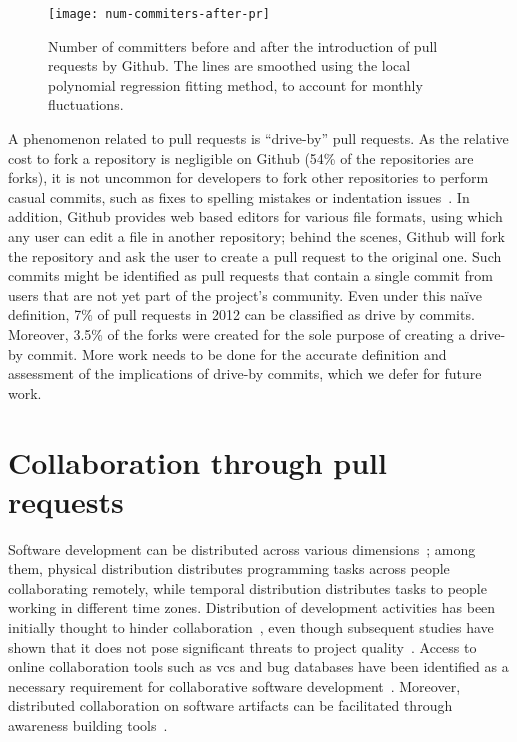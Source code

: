\documentclass{sig-alternate}
\begin{document}
\begin{figure}
  \begin{center}
    \texttt{[image: num-commiters-after-pr]}
  \end{center}
  \caption{Number of committers before and after the introduction of pull
  requests by Github. The lines are smoothed using the local polynomial
  regression fitting method, to account for monthly fluctuations.}
  \label{fig:before-after-pr}
\end{figure}

A phenomenon related to pull requests is ``drive-by'' pull requests. As the
relative cost to fork a repository is negligible on Github (54\% of the
repositories are forks), it is not uncommon for developers to fork other
repositories to perform casual commits, such as fixes to spelling mistakes or
indentation issues~\cite{Pham13}. In addition, Github provides web based editors
for various file formats, using which any user can edit a file in another
repository; behind the scenes, Github will fork the repository and ask the user
to create a pull request to the original one. Such commits might be identified
as pull requests that contain a single commit from users that are not yet part
of the project's community. Even under this na\"ive definition, 7\% of pull
requests in 2012 can be classified as drive by commits. Moreover, 3.5\% of the
forks were created for the sole purpose of creating a drive-by commit. More
work needs to be done for the accurate definition and assessment of the
implications of drive-by commits, which we defer for future work.

\section{Collaboration through pull requests}

Software development can be distributed across various
dimensions~\cite{Gumm06}; among them, physical distribution distributes
programming tasks across people collaborating remotely, while temporal
distribution distributes tasks to people working in different time zones.
Distribution of development activities has been initially thought to hinder
collaboration~\cite{Herbs99, Batti01}, even though subsequent studies have
shown that it does not pose significant threats to project
quality~\cite{Spine06, Nguye08, Bird09a}. Access to online collaboration tools
such as {\sc vcs} and bug databases have been identified as a necessary
requirement for collaborative software development~\cite{Knuds76,Pilat06,
Catal06}. Moreover, distributed collaboration on software artifacts can be
facilitated through awareness building tools~\cite{Dabbi12, Treud12, Lanza10}. 
\end{document}
